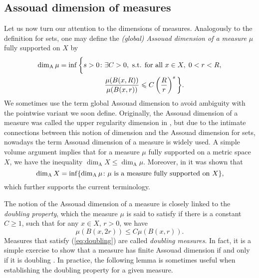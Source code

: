 \documentclass{PRM}
\newcommand{\adim}{\dim_{\mathrm{A}}}
\theoremstyle{plain}
\theoremstyle{definition}
\theoremstyle{remark}
\begin{document}
\subsection{Assouad dimension of measures}
Let us now turn our attention to the dimensions of measures. Analogously to the definition for sets, one may define the \emph{(global) Assouad dimension of a measure $\mu$} fully supported on $X$ by
\begin{align*}
    \adim \mu=\inf\bigg\{ s>0\colon& \exists C>0,\textnormal{ s.t. for all }x\in X,\; 0<r<R,\\
    &\frac{\mu(B(x,R))}{\mu(B(x,r))}\leq C\left(\frac{R}{r}\right)^s\bigg\}.
\end{align*}
We sometimes use the term global Assouad dimension to avoid ambiguity with the pointwise variant we soon define.
Originally, the Assouad dimension of a measure was called the upper regularity dimension in \cite{KLV}, but due to the intimate connections between this notion of dimension and the Assouad dimension for sets, nowadays the term Assouad dimension of a measure is widely used. A simple volume argument implies that for a measure $\mu$ fully supported on a metric space $X$, we have the inequality $\adim X\leq \adim\mu$. Moreover, in \cite{VK, LS} it was shown that
\begin{equation*}
    \adim X=\inf\{\adim\mu\colon \mu\textnormal{ is a measure fully supported on }X\},
\end{equation*}
which further supports the current terminology.

The notion of the Assouad dimension of a measure is closely linked to the \emph{doubling property}, which the measure $\mu$ is said to satisfy if there is a constant $C\geq 1$, such that for any $x\in X$, $r>0$, we have
\begin{equation}\label{eq:doubling}
    \mu(B(x,2r))\leq C\mu(B(x,r)).
\end{equation}
Measures that satisfy (\ref{eq:doubling}) are called \emph{doubling measures}. In fact, it is a simple exercise to show that a measure has finite Assouad dimension if and only if it is doubling \cite[Lemma 4.1.1]{F}. In practice, the following lemma is sometimes useful when establishing the doubling property for a given measure.
\end{document}
